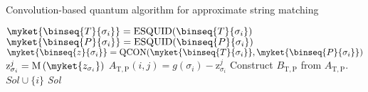 \begin{algorithm}
	\caption{Convolution-based quantum algorithm for approximate string matching}
	\label{alg:convolution-based-quantum-algorithm}
	\begin{algorithmic}[1]
				\STATE $\myket{\binseq{T}{\sigma_i}} = \mathrm{ESQUID}(\binseq{T}{\sigma_i})$
				\STATE $\myket{\binseq{P}{\sigma_i}} = \mathrm{ESQUID}(\binseq{P}{\sigma_i})$
				\STATE $\myket{\binseq{z}{\sigma_i}} = \mathrm{QCON}(\myket{\binseq{T}{\sigma_i}},\myket{\binseq{P}{\sigma_i}})$
				\STATE $\mathrm{z}^j_{\sigma_i} = \mathrm{M}\left( \myket{z_{\sigma_i}} \right)$
				\STATE $A_{\mathrm{T},\mathrm{P}}(i,j) = g(\sigma_i) - \mathrm{z}^j_{\sigma_i}$
			\ENDFOR
		\ENDFOR
		\STATE Construct $B_{\mathrm{T},\mathrm{P}}$ from $A_{\mathrm{T},\mathrm{P}}$.
				\STATE $Sol \cup \{i\}$
			\ENDIF
		\ENDFOR
		\RETURN \textit{Sol}
		
	\end{algorithmic}
\end{algorithm}

